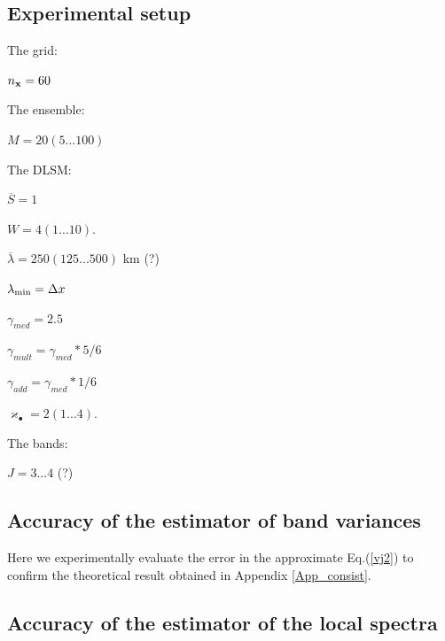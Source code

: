 \documentclass[12pt]{article}
\begin{document}
\subsection {Experimental setup}
\label{sec_expm_setup}



The grid:

$n_{\bf x}=60$

\noindent
The ensemble:

$M=20(5...100)$

\noindent
The DLSM:

$\overline{S}=1$

$W=4 (1...10)$.

$\overline{\lambda}=250 (125...500)$ km (?)

${\lambda}_{\rm min}=\Delta x$ 


$\gamma_{med} = 2.5$

$\gamma_{mult} = \gamma_{med}  * 5 / 6 $

$\gamma_{add} = \gamma_{med}  * 1 / 6 $

$\varkappa_\bullet=2 (1...4)$.



\noindent
The bands:

$J=3...4$ (?)











\subsection {Accuracy of the estimator of band variances}
\label{sec_expm_estm_band}


Here we experimentally evaluate the error in the approximate Eq.(\ref{vj2})
to confirm the theoretical result obtained in Appendix \ref{App_consist}.








\subsection {Accuracy of the estimator of the local spectra}
\label{sec_expm_estm_spec}





\end{document}
